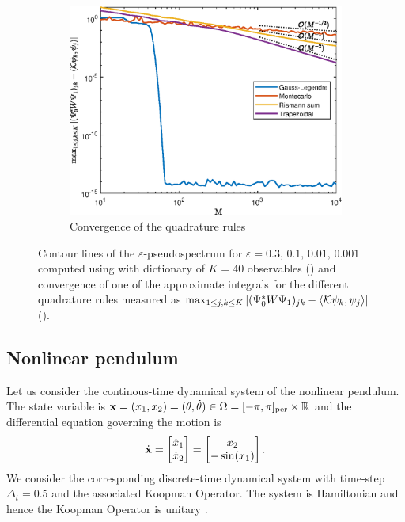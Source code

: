 \begin{figure}[h]
{\begin{subfigure}{0.45\textwidth}
        \includegraphics[width=\linewidth]{../code/figures/gauss_map/Galerkin_convergence.eps}
        \caption{Convergence of the quadrature rules}
        \label{gauss_convergence}
    \end{subfigure}\hspace*{\fill}
    }
    \caption{Contour lines of the $\varepsilon$-pseudospectrum for $\varepsilon = 0.3,\,0.1,\,0.01,\,0.001$ computed using  with dictionary of $K=40$ observables () and convergence of one of the approximate integrals for the different quadrature rules measured as $\max_{1\leq j,k \leq K} \abs{(\Psi_0^* W \Psi_1)_{jk} - \langle\mathcal{K}\psi_k, \psi_j\rangle}$ ().}
    \label{gauss_pseudospectrum_convergence}
\end{figure}

\subsection{Nonlinear pendulum}
Let us consider the continous-time dynamical system of the nonlinear pendulum. The state variable is $\vb{x} = (x_1, x_2) = (\theta, \dot{\theta}) \in \Omega = [-\pi, \pi]_{\text{per}} \times \mathbb{R}$ and the differential equation governing the motion is
\begin{equation}
    \label{pendulum_equation}
    \dot{\vb{x}} = 
    \begin{bmatrix}
    \dot{x}_1 \\
    \dot{x}_2
    \end{bmatrix} = 
    \begin{bmatrix}
    x_2 \\
    -\sin(x_1)
    \end{bmatrix}.
\end{equation}
We consider the corresponding discrete-time dynamical system with time-step $\Delta_t = 0.5$ and the associated Koopman Operator. The system is Hamiltonian and hence the Koopman Operator is unitary \cite{koopman_hamiltonian_1931}.

